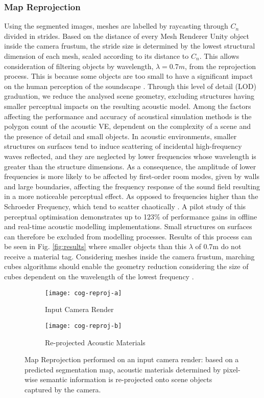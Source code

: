 \subsubsection{Map Reprojection}
Using the segmented images, meshes are labelled by raycasting through $C_n$ divided in strides. Based on the distance of every Mesh Renderer Unity object inside the camera frustum, the stride size is determined by the lowest structural dimension of each mesh, scaled according to its distance to $C_n$. This allows consideration of filtering objects by wavelength, $\lambda = 0.7m$, from the reprojection process. This is because some objects are too small to have a significant impact on the human perception of the soundscape \cite{pelzer2010frequency}. Through this level of detail (LOD) graduation, we reduce the analysed scene geometry, excluding structures having smaller perceptual impacts on the resulting acoustic model. Among the factors affecting the performance and accuracy of acoustical simulation methods is the polygon count of the acoustic VE, dependent on the complexity of a scene and the presence of detail and small objects. 
In acoustic environments, smaller structures on surfaces tend to induce scattering of incidental high-frequency waves reflected, and they are neglected by lower frequencies whose wavelength is greater than the structure dimensions. As a consequence, the amplitude of lower frequencies is more likely to be affected by first-order room modes, given by walls and large boundaries, affecting the frequency response of the sound field resulting in a more noticeable perceptual effect. As opposed to frequencies higher than the Schroeder Frequency, which tend to scatter chaotically \cite{kuttruff2016room, blauert1997spatial}.
A pilot study of this perceptual optimisation demonstrates up to 123\% of performance gains in offline and real-time acoustic modelling implementations. Small structures on surfaces can therefore be excluded from modelling processes. Results of this process can be seen in Fig. \ref{fig:results} where smaller objects than this $\lambda$ of 0.7m do not receive a material tag. Considering meshes inside the camera frustum, marching cubes algorithms should enable the geometry reduction considering the size of cubes dependent on the wavelength of the lowest frequency \cite{pelzer2010frequency}.
\begin{figure}
    \centering
    \begin{subfigure}[t]{0.49\textwidth}
       \centering
       \texttt{[image: cog-reproj-a]}
       \caption{Input Camera Render}
       \label{fig:cog-reproj-a}
    \end{subfigure}
    \begin{subfigure}[t]{0.49\textwidth}
       \centering
       \texttt{[image: cog-reproj-b]}
       \caption{Re-projected Acoustic Materials}
       \label{fig:cog-reproj-b}
    \end{subfigure}
\caption{Map Reprojection performed on an input camera render: based on a predicted segmentation map, acoustic materials determined by pixel-wise semantic information is re-projected onto scene objects captured by the camera.}
\label{fig:cog-reprojection}
\end{figure}

